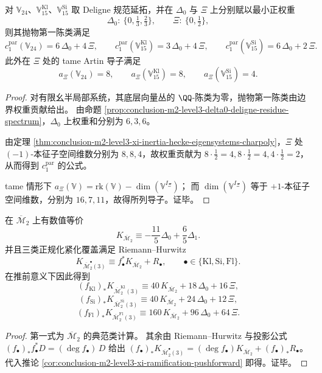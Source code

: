 \begin{proposition}\label{prop:conclusion-m2-level3-xi-artin-parabolic-c1}
对 \(\mathbb V_{24}\)、\(\mathbb V_{15}^{\mathrm{Kl}}\)、\(\mathbb V_{15}^{\mathrm{Si}}\) 取 Deligne 规范延拓，并在 \(\Delta_0\) 与 \(\Xi\) 上分别赋以最小正权重
\[
\Delta_0:\ \{0,\tfrac13,\tfrac23\},
\qquad
\Xi:\ \{0,\tfrac12\},
\]
则其抛物第一陈类满足
\[
c_1^{\mathrm{par}}(\mathbb V_{24})=6\,\Delta_0+4\,\Xi,\qquad
c_1^{\mathrm{par}}(\mathbb V_{15}^{\mathrm{Kl}})=3\,\Delta_0+4\,\Xi,\qquad
c_1^{\mathrm{par}}(\mathbb V_{15}^{\mathrm{Si}})=6\,\Delta_0+2\,\Xi.
\]
此外在 \(\Xi\) 处的 tame Artin 导子满足
\[
a_{\Xi}(\mathbb V_{24})=8,\qquad
a_{\Xi}(\mathbb V_{15}^{\mathrm{Kl}})=8,\qquad
a_{\Xi}(\mathbb V_{15}^{\mathrm{Si}})=4.
\]
\end{proposition}
\begin{proof}
对有限幺半局部系统，其底层向量丛的 \(\QQ\)-陈类为零，抛物第一陈类由边界权重贡献给出。
由命题 \ref{prop:conclusion-m2-level3-delta0-deligne-residue-spectrum}，\(\Delta_0\) 上权重和分别为 \(6,3,6\)。
\par
由定理 \ref{thm:conclusion-m2-level3-xi-inertia-hecke-eigensystems-charpoly}，\(\Xi\) 处 \((-1)\)-本征子空间维数分别为 \(8,8,4\)，故权重贡献为
\(
8\cdot \tfrac12=4,
8\cdot \tfrac12=4,
4\cdot \tfrac12=2
\)，从而得到 \(c_1^{\mathrm{par}}\) 的公式。
\par
tame 情形下 \(a_{\Xi}(\mathbb V)=\mathrm{rk}(\mathbb V)-\dim(\mathbb V^{I_{\Xi}})\)；
而 \(\dim(\mathbb V^{I_{\Xi}})\) 等于 \(+1\)-本征子空间维数，分别为 \(16,7,11\)，故得所列导子。证毕。
\end{proof}

\begin{theorem}[典范类推前与显式分歧修正]\label{thm:conclusion-m2-level3-canonical-pushforward-with-xi}
在 \(\overline{\mathcal M}_2\) 上有数值等价
\[
K_{\overline{\mathcal M}_2}\equiv -\frac{11}{5}\Delta_0+\frac{6}{5}\Delta_1.
\]
并且三类正规化紧化覆盖满足 Riemann--Hurwitz
\[
K_{\overline{\mathcal M}_2^{\bullet}(3)}\equiv f_\bullet^\ast K_{\overline{\mathcal M}_2}+R_\bullet,
\qquad \bullet\in\{\mathrm{Kl},\mathrm{Si},\mathrm{Fl}\}.
\]
在推前意义下因此得到
\[
(f_{\mathrm{Kl}})_*K_{\overline{\mathcal M}_2^{\mathrm{Kl}}(3)}
\equiv 40\,K_{\overline{\mathcal M}_2}+18\,\Delta_0+16\,\Xi,
\]
\[
(f_{\mathrm{Si}})_*K_{\overline{\mathcal M}_2^{\mathrm{Si}}(3)}
\equiv 40\,K_{\overline{\mathcal M}_2}+24\,\Delta_0+12\,\Xi,
\]
\[
(f_{\mathrm{Fl}})_*K_{\overline{\mathcal M}_2^{\mathrm{Fl}}(3)}
\equiv 160\,K_{\overline{\mathcal M}_2}+96\,\Delta_0+64\,\Xi.
\]
\end{theorem}
\begin{proof}
第一式为 \(\overline{\mathcal M}_2\) 的典范类计算。
其余由 Riemann--Hurwitz 与投影公式
\(
(f_\bullet)_*f_\bullet^\ast D=(\deg f_\bullet)\,D
\)
给出
\(
(f_\bullet)_*K_{\overline{\mathcal M}_2^{\bullet}(3)}=(\deg f_\bullet)K_{\overline{\mathcal M}_2}+(f_\bullet)_*R_\bullet
\)。
代入推论 \ref{cor:conclusion-m2-level3-xi-ramification-pushforward} 即得。证毕。
\end{proof}

